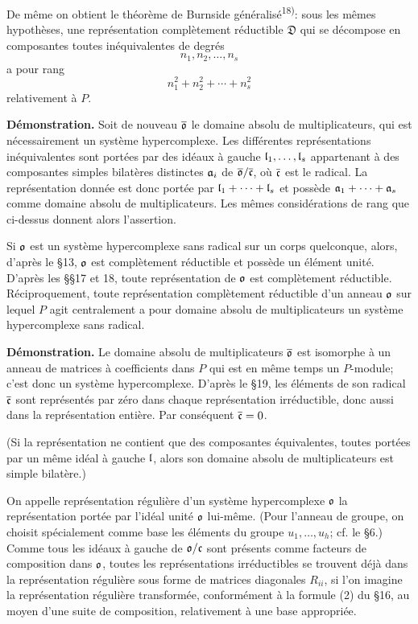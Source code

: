 De même on obtient le théorème de Burnside généralisé\textsuperscript{18)}: sous les mêmes hypothèses, une représentation complètement réductible $\mathfrak D$ qui se décompose en composantes toutes inéquivalentes de degrés
\[
        n_1,n_2,\ldots,n_s
\]
a pour rang
\[
        n_1^2+n_2^2+\cdots+n_s^2
\]
relativement à $P$.

\textbf{Démonstration.} Soit de nouveau $\overline{\mathfrak{o}}$ le domaine absolu de multiplicateurs, qui est nécessairement un système hypercomplexe. Les différentes représentations inéquivalentes sont portées par des idéaux à gauche $\mathfrak{l}_1,\ldots,\mathfrak{l}_s$ appartenant à des composantes simples bilatères distinctes $\mathfrak{a}_i$ de $\overline{\mathfrak{o}}/\overline{\mathfrak{c}}$, où $\overline{\mathfrak{c}}$ est le radical. La représentation donnée est donc portée par $\mathfrak{l}_1+\cdots+\mathfrak{l}_s$ et possède $\mathfrak{a}_1+\cdots+\mathfrak{a}_s$ comme domaine absolu de multiplicateurs. Les mêmes considérations de rang que ci-dessus donnent alors l'assertion.

Si $\mathfrak{o}$ est un système hypercomplexe sans radical sur un corps quelconque, alors, d'après le \S{}13, $\mathfrak{o}$ est complètement réductible et possède un élément unité. D'après les \S{}\S{}17 et 18, toute représentation de $\mathfrak{o}$ est complètement réductible. Réciproquement, toute représentation complètement réductible d'un anneau $\mathfrak{o}$ sur lequel $P$ agit centralement a pour domaine absolu de multiplicateurs un système hypercomplexe sans radical.

\textbf{Démonstration.} Le domaine absolu de multiplicateurs $\overline{\mathfrak{o}}$ est isomorphe à un anneau de matrices à coefficients dans $P$ qui est en même temps un $P$-module; c'est donc un système hypercomplexe. D'après le \S{}19, les éléments de son radical $\overline{\mathfrak{c}}$ sont représentés par zéro dans chaque représentation irréductible, donc aussi dans la représentation entière. Par conséquent $\overline{\mathfrak{c}}=0$.

(Si la représentation ne contient que des composantes équivalentes, toutes portées par un même idéal à gauche $\mathfrak{l}$, alors son domaine absolu de multiplicateurs est simple bilatère.)

On appelle représentation régulière d'un système hypercomplexe $\mathfrak{o}$ la représentation portée par l'idéal unité $\mathfrak{o}$ lui-même. (Pour l'anneau de groupe, on choisit spécialement comme base les éléments du groupe $u_1,\ldots,u_h$; cf. le \S{}6.) Comme tous les idéaux à gauche de $\mathfrak{o}/\mathfrak{c}$ sont présents comme facteurs de composition dans $\mathfrak{o}$, toutes les représentations irréductibles se trouvent déjà dans la représentation régulière sous forme de matrices diagonales $R_{ii}$, si l'on imagine la représentation régulière transformée, conformément à la formule (2) du \S{}16, au moyen d'une suite de composition, relativement à une base appropriée.

